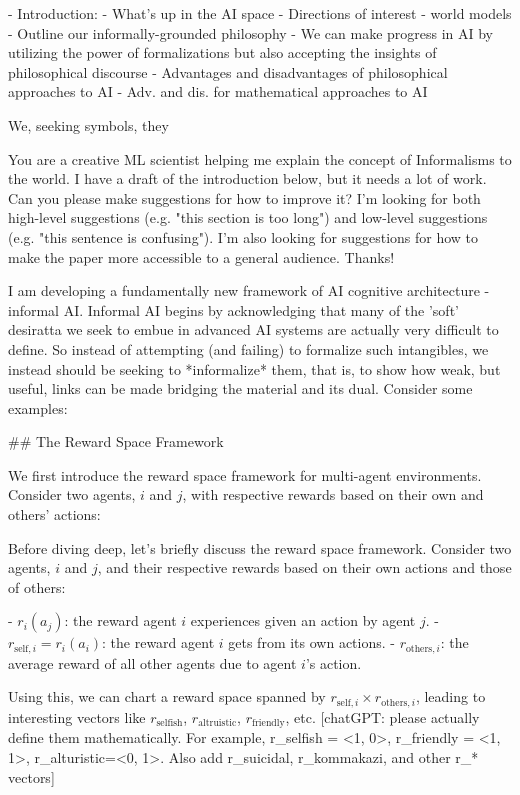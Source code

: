 - Introduction:
  - What's up in the AI space
  - Directions of interest
    - world models
  - Outline our informally-grounded philosophy
    - We can make progress in AI by utilizing the power of formalizations but also accepting the insights of philosophical discourse
    - Advantages and disadvantages of philosophical approaches to AI
    - Adv. and dis. for mathematical approaches to AI

We, seeking symbols, they 



You are a creative ML scientist helping me explain the concept of Informalisms to the world. I have a draft of the introduction below, but it needs a lot of work. Can you please make suggestions for how to improve it? I'm looking for both high-level suggestions (e.g. "this section is too long") and low-level suggestions (e.g. "this sentence is confusing"). I'm also looking for suggestions for how to make the paper more accessible to a general audience. Thanks!

I am developing a fundamentally new framework of AI cognitive architecture - informal AI. Informal AI begins by acknowledging that many of the 'soft' desiratta we seek to embue in advanced AI systems are actually very difficult to define. So instead of attempting (and failing) to formalize such intangibles, we instead should be seeking to *informalize* them, that is, to show how weak, but useful, links can be made bridging the material and its dual. Consider some examples:

## The Reward Space Framework

We first introduce the reward space framework for multi-agent environments. Consider two agents, \(i\) and \(j\), with respective rewards based on their own and others' actions:

Before diving deep, let's briefly discuss the reward space framework. Consider two agents, \(i\) and \(j\), and their respective rewards based on their own actions and those of others:

- \( r_i(a_j) \): the reward agent \(i\) experiences given an action by agent \(j\).
- \( r_{\text{self},i} = r_i(a_i) \): the reward agent \(i\) gets from its own actions.
- \( r_{\text{others},i} \): the average reward of all other agents due to agent \(i\)'s action.

Using this, we can chart a reward space spanned by \( r_{\text{self},i} \times r_{\text{others},i} \), leading to interesting vectors like \( r_{\text{selfish}} \), \( r_{\text{altruistic}} \), \( r_{\text{friendly}} \), etc. [chatGPT: please actually define them mathematically. For example, r_{selfish} = <1, 0>, r_{friendly} = <1, 1>, r_alturistic=<0, 1>. Also add r_suicidal, r_kommakazi, and other r_* vectors]

